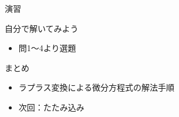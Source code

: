 \documentclass[aspectratio=43,professionalfonts,handout]{beamer}
\begin{document}
\begin{frame}{演習}
  \begin{exampleblock}{自分で解いてみよう}
  \begin{itemize}
    \item 問1〜4より選題
  \end{itemize}
  \end{exampleblock}
\end{frame}

\begin{frame}{まとめ}
  \begin{itemize}
    \item ラプラス変換による微分方程式の解法手順
    \item 次回：たたみ込み
  \end{itemize}
\end{frame}
\end{document}
